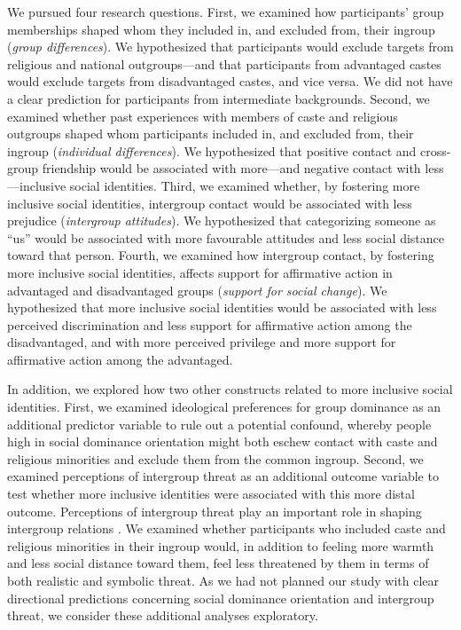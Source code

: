 \documentclass[12pt, a4paper]{article}
\begin{document}
We pursued four research questions. First, we examined how participants’ group memberships shaped whom they included in, and excluded from, their ingroup (\emph{group differences}). We hypothesized that participants would exclude targets from religious and national outgroups---and that participants from advantaged castes would exclude targets from disadvantaged castes, and vice versa. We did not have a clear prediction for participants from intermediate backgrounds. Second, we examined whether past experiences with members of caste and religious outgroups shaped whom participants included in, and excluded from, their ingroup (\emph{individual differences}). We hypothesized that positive contact and cross-group friendship would be associated with more---and negative contact \parencite{barlow_contact_2012, hayward_toward_2017} with less---inclusive social identities. Third, we examined whether, by fostering more inclusive social identities, intergroup contact would be associated with less prejudice (\emph{intergroup attitudes}). We hypothesized that categorizing someone as “us” would be associated with more favourable attitudes and less social distance toward that person. Fourth, we examined how intergroup contact, by fostering more inclusive social identities, affects support for affirmative action in advantaged and disadvantaged groups (\emph{support for social change}). We hypothesized that more inclusive social identities would be associated with less perceived discrimination and less support for affirmative action among the disadvantaged, and with more perceived privilege and more support for affirmative action among the advantaged.

In addition, we explored how two other constructs related to more inclusive social identities. First, we examined ideological preferences for group dominance \parencite{sidanius_social_1999} as an additional predictor variable to rule out a potential confound, whereby people high in social dominance orientation might both eschew contact with caste and religious minorities and exclude them from the common ingroup. Second, we examined perceptions of intergroup threat as an additional outcome variable to test whether more inclusive identities were associated with this more distal outcome. Perceptions of intergroup threat play an important role in shaping intergroup relations \parencite[for a review, see][]{nelson_intergroup_2016}. We examined whether participants who included caste and religious minorities in their ingroup would, in addition to feeling more warmth and less social distance toward them, feel less threatened by them in terms of both realistic and symbolic threat. As we had not planned our study with clear directional predictions concerning social dominance orientation and intergroup threat, we consider these additional analyses exploratory.
\end{document}
